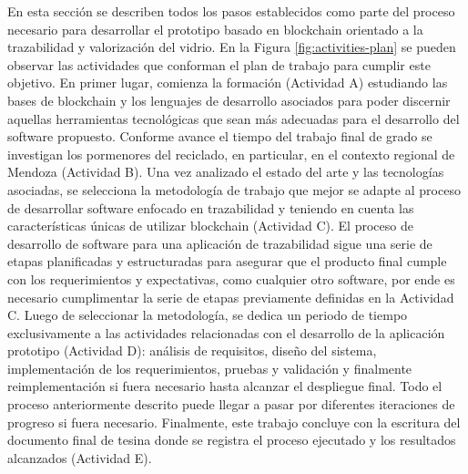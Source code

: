 En esta sección se describen todos los pasos establecidos como parte del proceso necesario para desarrollar el prototipo basado en blockchain orientado a la trazabilidad y valorización del vidrio. En la Figura \ref{fig:activities-plan} se pueden observar las actividades que conforman el plan de trabajo para cumplir este objetivo. En primer lugar, comienza la formación (Actividad A) estudiando las bases de blockchain y los lenguajes de desarrollo asociados para poder discernir aquellas herramientas tecnológicas que sean más adecuadas para el desarrollo del software propuesto. Conforme avance el tiempo del trabajo final de grado se investigan los pormenores del reciclado, en particular, en el contexto regional de Mendoza (Actividad B). Una vez analizado el estado del arte y las tecnologías asociadas, se selecciona la metodología de trabajo que mejor se adapte al proceso de desarrollar software enfocado en trazabilidad y teniendo en cuenta las características únicas de utilizar blockchain (Actividad C). El proceso de desarrollo de software para una aplicación de trazabilidad sigue una serie de etapas planificadas y estructuradas para asegurar que el producto final cumple con los requerimientos y expectativas, como cualquier otro software, por ende es necesario cumplimentar la serie de etapas previamente definidas en la Actividad C. Luego de seleccionar la metodología, se dedica un periodo de tiempo exclusivamente a las actividades relacionadas con el desarrollo de la aplicación prototipo (Actividad D): análisis de requisitos, diseño del sistema, implementación de los requerimientos, pruebas y validación y finalmente reimplementación si fuera necesario hasta alcanzar el despliegue final. Todo el proceso anteriormente descrito puede llegar a pasar por diferentes iteraciones de progreso si fuera necesario. Finalmente, este trabajo concluye con la escritura del documento final de tesina donde se registra el proceso ejecutado y los resultados alcanzados (Actividad E).

